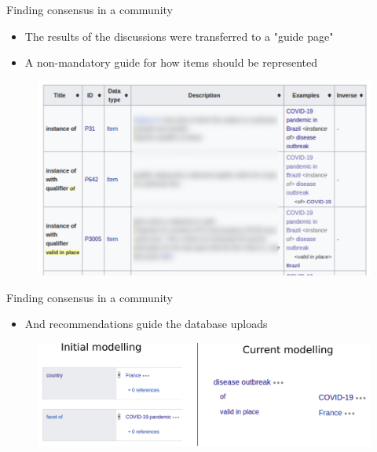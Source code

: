 \documentclass{beamer}
\begin{document}
\begin{frame}{Finding consensus in a community}
\begin{itemize}
    \item The results of the discussions were transferred to a "guide page"
    \item A non-mandatory guide for how items should be represented
    
\end{itemize}

\begin{figure}
\includegraphics[scale=0.65]{fig/outbreak_datamodel_table.png}
\end{figure}
\end{frame}


\begin{frame}{Finding consensus in a community}
\begin{itemize}
    \item And recommendations guide the database uploads
\end{itemize}

\begin{figure}
\includegraphics[scale=0.65]{fig/model_evolution.png}
\end{figure}

\end{frame}

\end{document}
